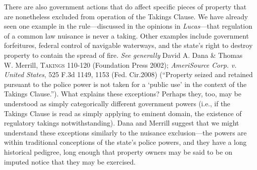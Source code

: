 There are also government actions that do affect specific pieces of property
that are nonetheless excluded from operation of the Takings Clause. We have
already seen one example in the rule---discussed in the opinions in
\textit{Lucas}---that regulation of a common law nuisance is never a taking.
Other examples include government forfeitures, federal control of navigable
waterways, and the state's right to destroy property to contain the spread of
fire. \textit{See generally} David A. Dana \& Thomas W. Merrill,
\textsc{Takings} 110-120 (Foundation Press 2002); \emph{AmeriSource Corp. v.
United States}, 525 F.3d 1149, 1153 (Fed. Cir.2008) (``Property seized and
retained pursuant to the police power is not taken for a `public use' in the
context of the Takings Clause.''). What explains these exceptions? Perhaps they,
too, may be understood as simply categorically different government powers
(i.e., if the Takings Clause is read as simply applying to eminent domain, the
existence of regulatory takings notwithstanding). Dana and Merrill suggest that
we might understand these exceptions similarly to the nuisance exclusion---the
powers are within traditional conceptions of the state's police powers, and they
have a long historical pedigree, long enough that property owners may be said to
be on imputed notice that they may be exercised. 

